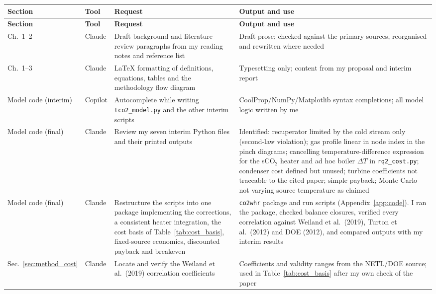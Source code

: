 \documentclass[12pt,a4paper]{report}
\begin{document}
\begin{longtable}{>{\raggedright\arraybackslash}p{2.2cm}
  >{\raggedright\arraybackslash}p{1.6cm}
  >{\raggedright\arraybackslash}p{4.3cm}
  >{\raggedright\arraybackslash}p{6.0cm}}
\toprule
\rowcolor{tableheader}
\textbf{Section} & \textbf{Tool} & \textbf{Request} & \textbf{Output and use} \\
\midrule
\endfirsthead
\toprule
\rowcolor{tableheader}
\textbf{Section} & \textbf{Tool} & \textbf{Request} & \textbf{Output and use} \\
\midrule
\endhead
\bottomrule
\endlastfoot
Ch.~1--2 & Claude & Draft background and literature-review paragraphs from my reading notes and reference list & Draft prose; checked against the primary sources, reorganised and rewritten where needed \\
Ch.~1--3 & Claude & \LaTeX{} formatting of definitions, equations, tables and the methodology flow diagram & Typesetting only; content from my proposal and interim report \\
Model code (interim) & Copilot & Autocomplete while writing \texttt{tco2\_model.py} and the other interim scripts & CoolProp/NumPy/Matplotlib syntax completions; all model logic written by me \\
Model code (final) & Claude & Review my seven interim Python files and their printed outputs & Identified: recuperator limited by the cold stream only (second-law violation); gas profile linear in node index in the pinch diagrams; cancelling temperature-difference expression for the sCO$_2$ heater and ad hoc boiler $\Delta T$ in \texttt{rq2\_cost.py}; condenser cost defined but unused; turbine coefficients not traceable to the cited paper; simple payback; Monte Carlo not varying source temperature as claimed \\
Model code (final) & Claude & Restructure the scripts into one package implementing the corrections, a consistent heater integration, the cost basis of Table~\ref{tab:cost_basis}, fixed-source economics, discounted payback and breakeven & \texttt{co2whr} package and run scripts (Appendix~\ref{app:code}). I ran the package, checked balance closures, verified every correlation against Weiland et al.~(2019), Turton et al.~(2012) and DOE (2012), and compared outputs with my interim results \\
Sec.~\ref{sec:method_cost} & Claude & Locate and verify the Weiland et al.~(2019) correlation coefficients & Coefficients and validity ranges from the NETL/DOE source; used in Table~\ref{tab:cost_basis} after my own check of the paper \\

\end{longtable}
\end{document}
